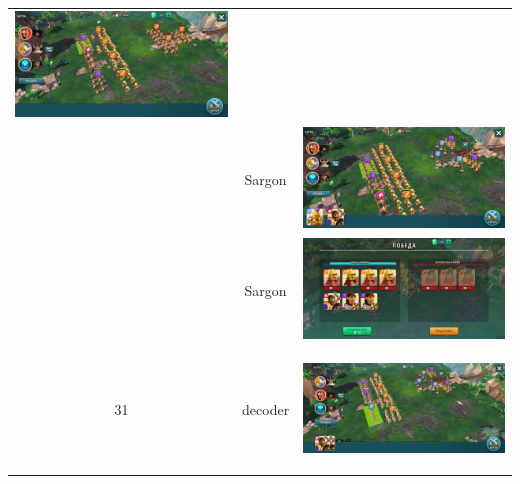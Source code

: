 \begin{longtable}{|c|c|c|}
	\includegraphics[width=0.75\linewidth]{./parts/media/TreasureHunt/31/sargon/photo_2022-04-07_10-05-22.jpg} \\
	& Sargon &
	\includegraphics[width=0.75\linewidth]{./parts/media/TreasureHunt/31/sargon/photo_2022-04-07_10-05-08.jpg} \\
	& Sargon &
	\includegraphics[width=0.75\linewidth]{./parts/media/TreasureHunt/31/sargon/photo_2022-04-07_10-05-25.jpg} \\
	\hline
	\multirow{8}{*}{31} & decoder &
	\hypertarget{fight31}{\includegraphics[width=0.75\linewidth]{./parts/media/TreasureHunt/31/decoder/photo_2022-04-07_09-59-48.jpg}} \\

\end{longtable}
